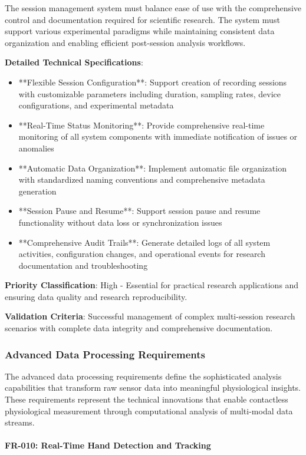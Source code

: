 \documentclass[11pt,a4paper]{report}
\begin{document}
The session management system must balance ease of use with the comprehensive control and documentation required for
scientific research. The system must support various experimental paradigms while maintaining consistent data
organization and enabling efficient post-session analysis workflows.

\textbf{Detailed Technical Specifications}:

\begin{itemize}
\item **Flexible Session Configuration**: Support creation of recording sessions with customizable parameters including
  duration, sampling rates, device configurations, and experimental metadata
\item **Real-Time Status Monitoring**: Provide comprehensive real-time monitoring of all system components with immediate
  notification of issues or anomalies
\item **Automatic Data Organization**: Implement automatic file organization with standardized naming conventions and
  comprehensive metadata generation
\item **Session Pause and Resume**: Support session pause and resume functionality without data loss or synchronization
  issues
\item **Comprehensive Audit Trails**: Generate detailed logs of all system activities, configuration changes, and
  operational events for research documentation and troubleshooting

\end{itemize}
\textbf{Priority Classification}: High - Essential for practical research applications and ensuring data quality and research
reproducibility.

\textbf{Validation Criteria}: Successful management of complex multi-session research scenarios with complete data integrity
and comprehensive documentation.

\subsubsection{Advanced Data Processing Requirements}

The advanced data processing requirements define the sophisticated analysis capabilities that transform raw sensor data
into meaningful physiological insights. These requirements represent the technical innovations that enable contactless
physiological measurement through computational analysis of multi-modal data streams.

\paragraph{FR-010: Real-Time Hand Detection and Tracking}
\end{document}
